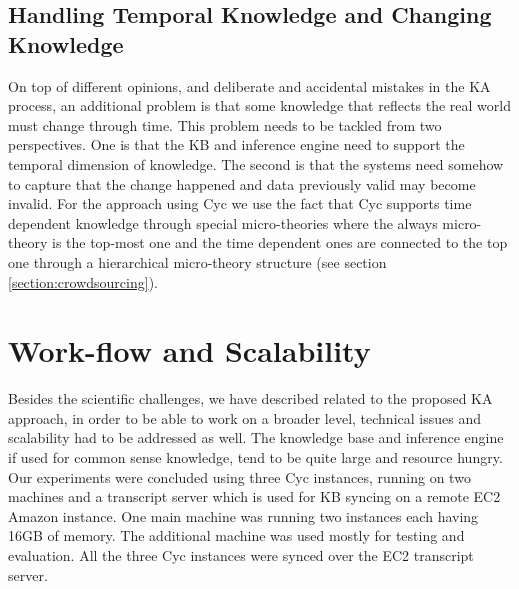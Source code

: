 \subsection{Handling Temporal Knowledge and Changing Knowledge}
On top of different opinions, and deliberate and accidental mistakes in the 
KA process, an additional problem is that some knowledge that reflects the real 
world must change through time. This problem needs to be tackled from two 
perspectives. One is that the KB and inference engine need to support the 
temporal dimension of knowledge. The second is that the systems need somehow to 
capture that the change happened and data previously valid may become invalid. 
For the approach using Cyc we use the fact that Cyc supports time dependent 
knowledge through special micro-theories where the always micro-theory is the 
top-most one and the time dependent ones are connected to the top one through 
a hierarchical micro-theory structure (see section \ref{section:crowdsourcing}). 

\section{Work-flow and Scalability}
Besides the scientific challenges, we have described related to the proposed 
KA approach, in order to be able to work on a broader level, technical issues 
and scalability had to be addressed as well. The knowledge base and inference 
engine if used for common sense knowledge, tend to be quite large and resource 
hungry. Our experiments were concluded using three Cyc instances, running on 
two machines and a transcript server which is used for KB syncing on a remote 
EC2 Amazon instance. One main machine was running two instances each having 
16GB of memory. The additional machine was used mostly for testing and 
evaluation. All the three Cyc instances were synced over the EC2 
transcript server.


